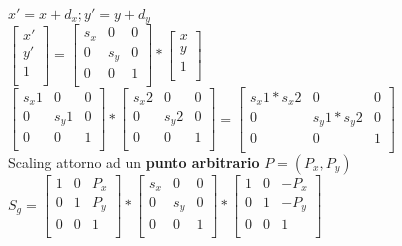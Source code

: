 $x'=x+d_x;y'=y+d_y$
\\
$\begin{bmatrix}
    x' \\
    y' \\
    1 \\
\end{bmatrix}
=
\begin{bmatrix}
s_x & 0 & 0 \\
0 & s_y & 0 \\
0 & 0 & 1 \\
\end{bmatrix}
*
\begin{bmatrix}
    x \\
    y \\
    1 \\
\end{bmatrix}
$
\\
$
\begin{bmatrix}
s_x1 & 0 & 0 \\
0 & s_y1 & 0 \\
0 & 0 & 1 \\
\end{bmatrix}
*
\begin{bmatrix}
    s_x2 & 0 & 0 \\
    0 & s_y2 & 0 \\
    0 & 0 & 1 \\
\end{bmatrix}
=
\begin{bmatrix}
    s_x1*s_x2 & 0 & 0 \\
    0 & s_y1*s_y2 & 0 \\
    0 & 0 & 1 \\
\end{bmatrix}
$ \\
Scaling attorno ad un \textbf{punto arbitrario} $P=(P_x,P_y)$ \\
$S_g=
    \begin{bmatrix}
    1 & 0 & P_x \\
    0 & 1 & P_y \\
    0 & 0 & 1 \\
    \end{bmatrix}
    *
    \begin{bmatrix}
        s_x & 0 & 0 \\
       0 & s_y & 0 \\
        0 & 0 & 1 \\
    \end{bmatrix}
    *
    \begin{bmatrix}
        1 & 0 & -P_x \\
        0 & 1 & -P_y \\
        0 & 0 & 1 \\
    \end{bmatrix} $
